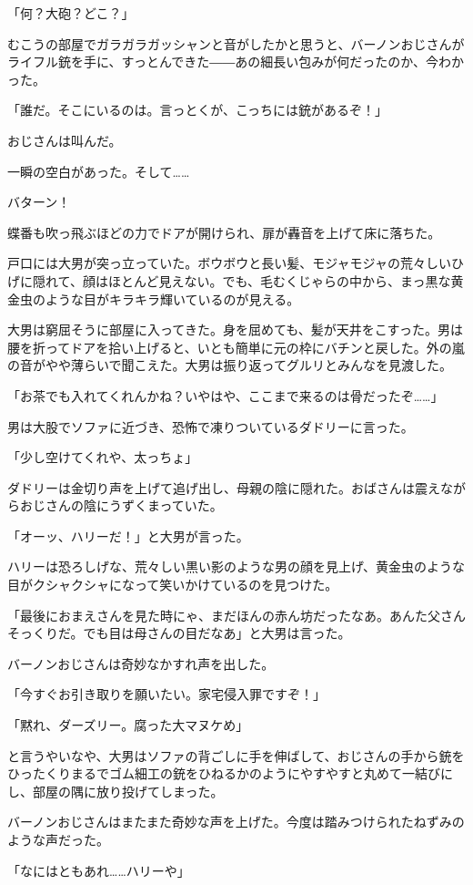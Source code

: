 \documentclass[10pt,a4paper]{article}
\begin{document}
\begin{CJK}{UTF8}{min}
「何？大砲？どこ？」

むこうの部屋でガラガラガッシャンと音がしたかと思うと、バーノンおじさんがライフル銃を手に、すっとんできた――あの細長い包みが何だったのか、今わかった。

「誰だ。そこにいるのは。言っとくが、こっちには銃があるぞ！」

おじさんは叫んだ。

一瞬の空白があった。そして……

バターン！

蝶番も吹っ飛ぶほどの力でドアが開けられ、扉が轟音を上げて床に落ちた。

戸口には大男が突っ立っていた。ボウボウと長い髪、モジャモジャの荒々しいひげに隠れて、顔はほとんど見えない。でも、毛むくじゃらの中から、まっ黒な黄金虫のような目がキラキラ輝いているのが見える。

大男は窮屈そうに部屋に入ってきた。身を屈めても、髪が天井をこすった。男は腰を折ってドアを拾い上げると、いとも簡単に元の枠にバチンと戻した。外の嵐の音がやや薄らいで聞こえた。大男は振り返ってグルリとみんなを見渡した。

「お茶でも入れてくれんかね？いやはや、ここまで来るのは骨だったぞ……」

男は大股でソファに近づき、恐怖で凍りついているダドリーに言った。

「少し空けてくれや、太っちょ」

ダドリーは金切り声を上げて追げ出し、母親の陰に隠れた。おばさんは震えながらおじさんの陰にうずくまっていた。

「オーッ、ハリーだ！」と大男が言った。

ハリーは恐ろしげな、荒々しい黒い影のような男の顔を見上げ、黄金虫のような目がクシャクシャになって笑いかけているのを見つけた。

「最後におまえさんを見た時にゃ、まだほんの赤ん坊だったなあ。あんた父さんそっくりだ。でも目は母さんの目だなあ」と大男は言った。

バーノンおじさんは奇妙なかすれ声を出した。

「今すぐお引き取りを願いたい。家宅侵入罪ですぞ！」

「黙れ、ダーズリー。腐った大マヌケめ」

と言うやいなや、大男はソファの背ごしに手を伸ばして、おじさんの手から銃をひったくりまるでゴム細工の銃をひねるかのようにやすやすと丸めて一結びにし、部屋の隅に放り投げてしまった。

バーノンおじさんはまたまた奇妙な声を上げた。今度は踏みつけられたねずみのような声だった。

「なにはともあれ……ハリーや」


\end{CJK}
\end{document}
